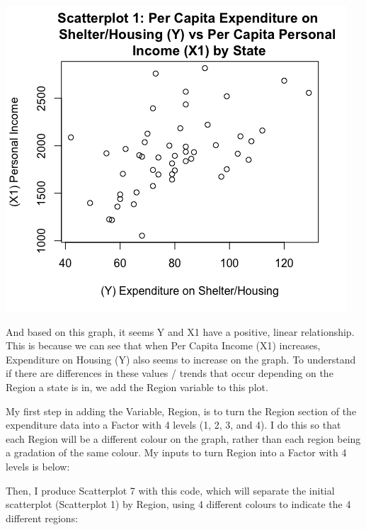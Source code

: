 \documentclass[12pt,letterpaper]{article}
\begin{document}
\begin{itemize}
		\begin{center}	
		\includegraphics[scale=.80]{Scatterplot1.png}
		\end{center}
		And based on this graph, it seems Y and X1 have a positive, linear relationship. This is because we can see that when Per Capita Income (X1) increases, Expenditure on Housing (Y) also seems to increase on the graph. To understand if there are differences in these values / trends that occur depending on the Region a state is in, we add the Region variable to this plot.
		
		My first step in adding the Variable, Region, is to turn the Region section of the expenditure data into a Factor with 4 levels
		(1, 2, 3, and 4). I do this so that each Region will be a different colour on the graph, rather than each region being a gradation of the same colour. My inputs to turn Region into a Factor with 4 levels is below:
		
		 
		
		Then, I produce Scatterplot 7 with this code, which will separate the initial scatterplot (Scatterplot 1) by Region, using 4 different colours to indicate the 4 different regions:
		
		 
		

\end{itemize}
\end{document}
